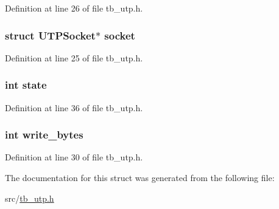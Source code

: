 Definition at line 26 of file tb\-\_\-utp.\-h.

\hypertarget{structtb__utp__t_add15e39a83c7a0c72140c305bdd386d0}{
\subsubsection[{socket}]{\setlength{\rightskip}{0pt plus 5cm}struct U\-T\-P\-Socket$\ast$ socket}}\label{structtb__utp__t_add15e39a83c7a0c72140c305bdd386d0}


Definition at line 25 of file tb\-\_\-utp.\-h.

\hypertarget{structtb__utp__t_a89f234133d3efe315836311cbf21c64b}{
\subsubsection[{state}]{\setlength{\rightskip}{0pt plus 5cm}int state}}\label{structtb__utp__t_a89f234133d3efe315836311cbf21c64b}


Definition at line 36 of file tb\-\_\-utp.\-h.

\hypertarget{structtb__utp__t_a814ec097a6a396e10f9f0924e924684e}{
\subsubsection[{write\-\_\-bytes}]{\setlength{\rightskip}{0pt plus 5cm}int write\-\_\-bytes}}\label{structtb__utp__t_a814ec097a6a396e10f9f0924e924684e}


Definition at line 30 of file tb\-\_\-utp.\-h.



The documentation for this struct was generated from the following file\-:\begin{DoxyCompactItemize}
\item 
src/\hyperlink{tb__utp_8h}{tb\-\_\-utp.\-h}\end{DoxyCompactItemize}

